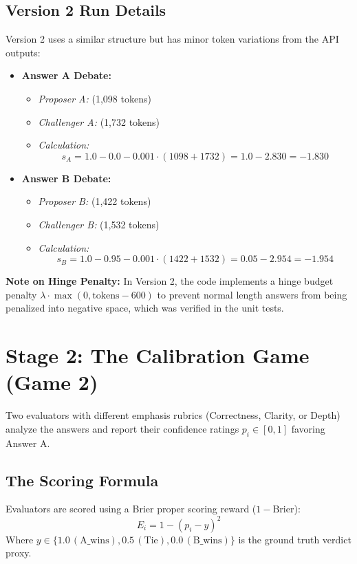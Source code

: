 \documentclass[11pt]{article}
\begin{document}
\subsection{Version 2 Run Details}
Version 2 uses a similar structure but has minor token variations from the API outputs:
\begin{itemize}
    \item \textbf{Answer A Debate:}
    \begin{itemize}
        \item \textit{Proposer A:} (1,098 tokens)
        \item \textit{Challenger A:} (1,732 tokens)
        \item \textit{Calculation:} 
        \[ s_A = 1.0 - 0.0 - 0.001 \cdot (1098 + 1732) = 1.0 - 2.830 = -1.830 \]
    \end{itemize}
    \item \textbf{Answer B Debate:}
    \begin{itemize}
        \item \textit{Proposer B:} (1,422 tokens)
        \item \textit{Challenger B:} (1,532 tokens)
        \item \textit{Calculation:} 
        \[ s_B = 1.0 - 0.95 - 0.001 \cdot (1422 + 1532) = 0.05 - 2.954 = -1.954 \]
    \end{itemize}
\end{itemize}
\textbf{Note on Hinge Penalty:} In Version 2, the code implements a hinge budget penalty $\lambda \cdot \max(0, \text{tokens} - 600)$ to prevent normal length answers from being penalized into negative space, which was verified in the unit tests.

\newpage

\section{Stage 2: The Calibration Game (Game 2)}
Two evaluators with different emphasis rubrics (Correctness, Clarity, or Depth) analyze the answers and report their confidence ratings $p_i \in [0, 1]$ favoring Answer A.

\subsection{The Scoring Formula}
Evaluators are scored using a Brier proper scoring reward ($1 - \text{Brier}$):
\begin{equation}
E_i = 1 - (p_i - y)^2
\end{equation}
Where $y \in \{1.0 \, (\text{A\_wins}), 0.5 \, (\text{Tie}), 0.0 \, (\text{B\_wins})\}$ is the ground truth verdict proxy.
\end{document}
